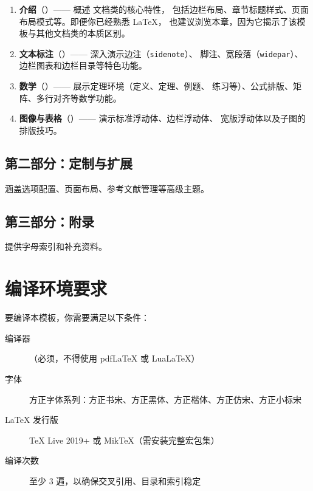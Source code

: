 \begin{enumerate}
    \item \textbf{介绍}（）—— 概述  文档类的核心特性，
        包括边栏布局、章节标题样式、页面布局模式等。即便你已经熟悉 \LaTeX，
        也建议浏览本章，因为它揭示了该模板与其他文档类的本质区别。
    \item \textbf{文本标注}（）—— 深入演示边注（\texttt{sidenote}）、
        脚注、宽段落（\texttt{widepar}）、边栏图表和边栏目录等特色功能。
    \item \textbf{数学}（）—— 展示定理环境（定义、定理、例题、
        练习等）、公式排版、矩阵、多行对齐等数学功能。
    \item \textbf{图像与表格}（）—— 演示标准浮动体、边栏浮动体、
        宽版浮动体以及子图的排版技巧。
\end{enumerate}

\subsection*{第二部分：定制与扩展}

涵盖选项配置、页面布局、参考文献管理等高级主题。

\subsection*{第三部分：附录}

提供字母索引和补充资料。


\section*{编译环境要求}

要编译本模板，你需要满足以下条件：

\begin{description}
    \item[编译器] \XeLaTeX{}（必须，不得使用 pdf\LaTeX{} 或 Lua\LaTeX{}）
    \item[字体] 方正字体系列：方正书宋、方正黑体、方正楷体、方正仿宋、方正小标宋
    \item[\LaTeX{} 发行版] TeX Live 2019+ 或 MikTeX（需安装完整宏包集）
    \item[编译次数] 至少 3 遍，以确保交叉引用、目录和索引稳定
\end{description}

